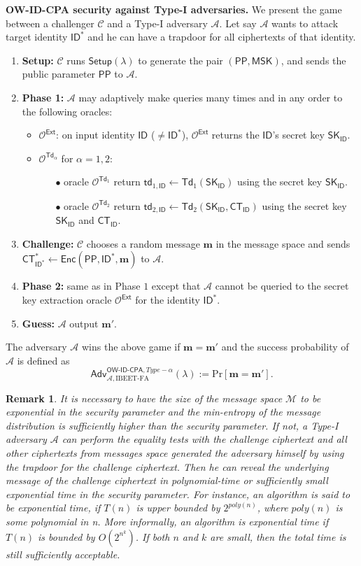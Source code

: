 \documentclass[runningheads,10pt]{llncs}
\newtheorem{rem}[thm]{Remark}
\def\cal{\mathcal}
\def\bf{\mathbf}
\def\SK{\mathsf{SK}}
\def\PP{\mathsf{PP}}
\def\MSK{\mathsf{MSK}}
\def\CT{\mathsf{CT}}
\def\td{\mathsf{td}}
\def\Setup{\mathsf{Setup}}
\def\Enc{\mathsf{Enc}}
\def\Ext{\mathsf{Ext}}
\def\Td{\mathsf{Td}}
\def\Pr{\mathrm{Pr}}
\def\Adv{\mathsf{Adv}}
\def\OW{\textsf{OW-ID-CPA}}
\def\ID{\mathsf{ID}}
\begin{document}
\noindent\textbf{OW-ID-CPA security against Type-I adversaries.}
We present the game between a challenger $\cal{C}$ and a Type-I adversary $\cal{A}$. Let say $\cal{A}$ wants to attack target identity $\ID^*$ and he can have a trapdoor for all ciphertexts of that identity.
\begin{enumerate}
	\item \textbf{Setup:} $\cal{C}$ runs $\Setup(\lambda)$ to generate the pair $(\PP,\MSK)$, and sends the public parameter $\PP$ to $\cal{A}$.
	\item \textbf{Phase 1:} $\cal{A}$ may adaptively make queries many times and in any order to the following oracles:
	\begin{itemize}
		\item $\cal{O}^{\Ext}$: on input identity $\ID$ ($\ne \ID^*$), $\cal{O}^{\Ext}$ returns the $\ID$'s secret key $\SK_{\ID}$.
		\item $\cal{O}^{\Td_\alpha}$ for $\alpha = 1, 2$:
		\begin{itemize}
			\item[$\bullet$] oracle $\cal{O}^{\Td_1}$ return $\td_{1, \ID}\gets\Td_1(\SK_{\ID})$ using the secret key $\SK_{\ID}$.
			\item[$\bullet$] oracle $\cal{O}^{\Td_2}$ return $\td_{2, \ID}\gets\Td_2(\SK_{\ID}, \CT_{\ID})$ using the secret key $\SK_{\ID}$ and $\CT_\ID$.
		\end{itemize}
	\end{itemize}
	\item \textbf{Challenge:} $\cal{C}$ chooses a random message $\bf{m}$ in the message space and sends $\CT^*_{\ID^*}\gets\Enc(\PP,\ID^*,\bf{m})$ to $\cal{A}$.
	\item \textbf{Phase 2:} same as in Phase $1$ except that $\cal{A}$ cannot be queried to the secret key extraction oracle $\cal{O}^{\Ext}$ for the identity $\ID^*$.
	\item \textbf{Guess:} $\cal{A}$ output $\bf{m}'$.
\end{enumerate}
The adversary $\cal{A}$ wins the above game if $\bf{m}=\bf{m}'$ and the success probability of $\cal{A}$ is defined as
$$\Adv^{\OW, Type-\alpha}_{\cal{A},\text{IBEET-FA}}(\lambda):=\Pr[\bf{m}=\bf{m}'].$$

\begin{rem}
	It is necessary to have the size of the message space $\cal{M}$ to be exponential in the security parameter and the min-entropy of the message distribution is sufficiently higher than the security parameter. If not, a Type-I adversary $\cal{A}$ can perform the equality tests with the challenge ciphertext and all other ciphertexts from messages space generated the adversary himself by using the trapdoor for the challenge ciphertext. Then he can reveal the underlying message of the challenge ciphertext in polynomial-time or sufficiently small exponential time in the security parameter. For instance, an algorithm is said to be exponential time, if $T(n)$ is upper bounded by $2^{poly(n)}$, where $poly(n)$ is some polynomial in n. More informally, an algorithm is exponential time if $T(n)$ is bounded by $O(2^{n^k})$. If both $n$ and $k$ are small, then the total time is still sufficiently acceptable.
\end{rem}
\end{document}
